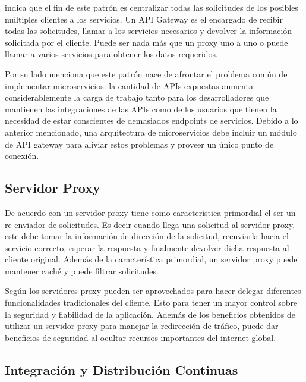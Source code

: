 \cite{trebichavsky2021api} indica que el fin de este patrón es centralizar todas las solicitudes
de los posibles múltiples clientes a los servicios.
Un API Gateway es el encargado de recibir todas las solicitudes, llamar a los servicios necesarios
y devolver la información solicitada por el cliente.
Puede ser nada más que un proxy uno a uno o puede llamar a varios servicios para obtener los datos 
requeridos.

Por su lado \cite{tomic2022towards} menciona que este patrón nace de afrontar el problema común
de implementar microservicios: la cantidad de APIs expuestas aumenta considerablemente la carga de trabajo
tanto para los desarrolladores que mantienen las integraciones de las APIs como de los usuarios que
tienen la necesidad de estar conscientes de demasiados endpoints de servicios.
Debido a lo anterior mencionado, una arquitectura de microservicios debe incluir un módulo de 
API gateway para aliviar estos problemas y proveer un único punto de conexión.
  

\subsection{Servidor Proxy}

De acuerdo con \cite{wenceslao2022network} un servidor proxy tiene como característica primordial el ser
un re-enviador de solicitudes.
Es decir cuando llega una solicitud al servidor proxy, este debe tomar la información de dirección
de la solicitud, reenviarla hacia el servicio correcto, esperar la respuesta y finalmente devolver
dicha respuesta al cliente original.
Además de la característica primordial, un servidor proxy puede mantener caché y puede filtrar solicitudes.

Según \cite{agyekum2021proxy} los servidores proxy pueden ser aprovechados para hacer delegar
diferentes funcionalidades tradicionales del cliente.
Esto para tener un mayor control sobre la seguridad y fiabilidad de la aplicación.
Además de los beneficios obtenidos de utilizar un servidor proxy para manejar la redirección
de tráfico, puede dar beneficios de seguridad al ocultar recursos importantes del internet global.

\subsection{Integración y Distribución Continuas}

